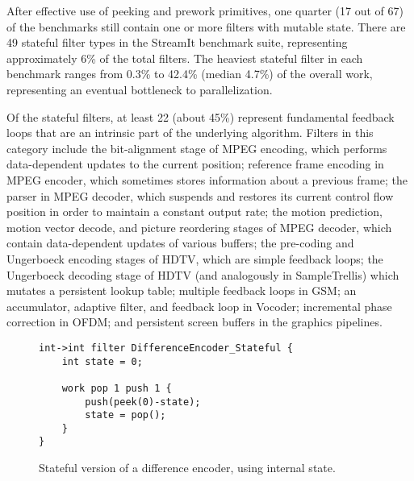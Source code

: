 \myitem{\stateful} After effective use of peeking and prework
primitives, one quarter (17 out of 67) of the benchmarks still contain
one or more filters with mutable state.  There are 49 stateful filter
types in the StreamIt benchmark suite, representing approximately 6\%
of the total filters.
The heaviest stateful filter in each benchmark ranges from 0.3\% to
42.4\% (median 4.7\%) of the overall work, representing an eventual
bottleneck to parallelization.
\label{sec:stateful}

Of the stateful filters, at least 22 (about 45\%) represent
fundamental feedback loops that are an intrinsic part of the
underlying algorithm.  Filters in this category include the
bit-alignment stage of MPEG encoding, which performs data-dependent
updates to the current position; reference frame encoding in MPEG
encoder, which sometimes stores information about a previous frame;
the parser in MPEG decoder, which suspends and restores its current
control flow position in order to maintain a constant output rate; the
motion prediction, motion vector decode, and picture reordering stages
of MPEG decoder, which contain data-dependent updates of various
buffers; the pre-coding and Ungerboeck encoding stages of HDTV, which
are simple feedback loops; the Ungerboeck decoding stage of HDTV (and
analogously in SampleTrellis) which mutates a persistent lookup table;
multiple feedback loops in GSM; an accumulator, adaptive filter, and
feedback loop in Vocoder; incremental phase correction in OFDM; and
persistent screen buffers in the graphics pipelines.

\begin{figure}[t!]
\vspace{-6pt}
\eightpoint
\begin{verbatim}
int->int filter DifferenceEncoder_Stateful {
    int state = 0;

    work pop 1 push 1 {
        push(peek(0)-state);
        state = pop();
    }
}
\end{verbatim}
\vspace{-10pt}
\caption{Stateful version of a difference encoder, using 
internal state.\protect\label{fig:diff-stateful}}
\end{figure}

